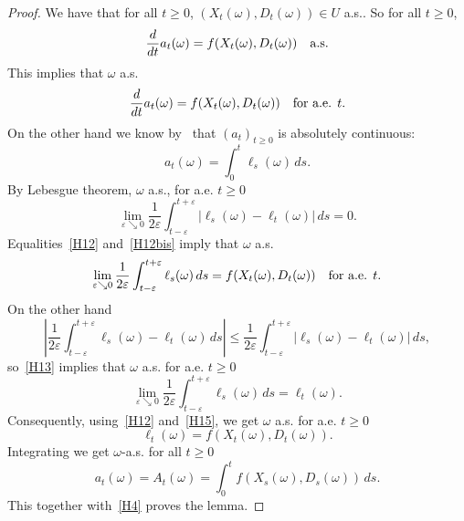 \documentclass[JEP,XML,SOM,Unicode,NoFloatCountersInSection,published]{cedram}
\theoremstyle{plain}
\theoremstyle{definition}
\let\f\frac
\let\e\varepsilon
\let\om\omega
\begin{document}
\begin{proof}
We have that for all $t\ge 0$, $(X_t(\om), D_t(\om))\in U$ a.s.. So for all $t\ge 0$,\vspace*{-3pt}
\begin{equation}
\f{d}{dt}a_t(\om)=f(X_t(\om), D_t(\om))\quad\hbox{a.s.}
\end{equation}
This implies that $\om$ a.s.\vspace*{-3pt}
\begin{equation}
\label{H12}
\f{d}{dt}a_t(\om)=f(X_t(\om), D_t(\om))\quad\hbox{for a.e. $t$}.
\end{equation}
On the other hand we know by~\cite[Th.\,10]{Meyer-Zheng:84} that $(a_t)_{t\ge 0}$ is absolutely continuous:\vspace*{-3pt}
\begin{equation}
\label{H12bis}
a_t(\om)=\int_0^t \ell_s(\om)\, ds.
\end{equation}
By Lebesgue theorem, $\om$ a.s., for a.e. $t\ge 0$\vspace*{-3pt}
\begin{equation}
\label{H13}
\lim_{\e \searrow 0} \f1{2\e}\int_{t-\e}^{t+\e}|\ell_s(\om)-\ell_t(\om)|\, ds=0.
\end{equation}
Equalities~\eqref{H12} and~\eqref{H12bis} imply that $\om$ a.s.\vspace*{-3pt}
\begin{equation}
\lim_{\e \searrow 0} \f1{2\e}\int_{t-\e}^{t+\e}\ell_s(\om)\, ds=f(X_t(\om), D_t(\om))\quad\hbox{for a.e. $ t$}.
\end{equation}
On the other hand\vspace*{-3pt}
\[
\left|\f1{2\e} \int_{t-\e}^{t+\e}\ell_s(\om)-\ell_t(\om)\, ds \right|\le \f1{2\e}\int_{t-\e}^{t+\e}|\ell_s(\om)-\ell_t(\om)|\, ds,
\]
so~\eqref{H13} implies that $\om$ a.s. for a.e. $t\ge 0$\vspace*{-3pt}
\begin{equation}
\label{H15}
\lim_{\e \searrow 0} \f1{2\e}\int_{t-\e}^{t+\e}\ell_s(\om)\, ds=\ell_t(\om).
\end{equation}
Consequently, using~\eqref{H12} and~\eqref{H15}, we get $\om$ a.s. for a.e. $t\ge 0$\vspace*{-3pt}
\begin{equation}
\ell_t(\om)=f(X_t(\om), D_t(\om)).
\end{equation}
Integrating we get $\om$-a.s. for all $t\ge 0$\vspace*{-3pt}
\begin{equation}
a_t(\om)=A_t(\om)=\int_0^t f(X_s(\om), D_s(\om))\, ds.
\end{equation}
This together with~\eqref{H4} proves the lemma.
\end{proof}




\end{document}

